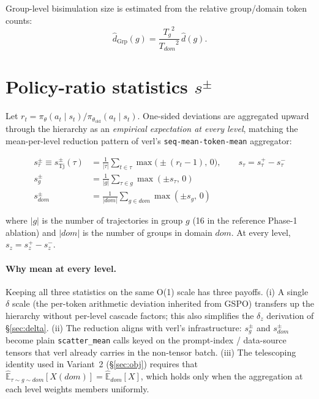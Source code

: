 \documentclass{article}
\begin{document}
Group-level bisimulation size is estimated from the relative group/domain
token counts:
\[
\hat d_{\operatorname{Grp}}(g)
  = \frac{{T_g}^{2}}{{T_{dom}}^{2}}\,\hat d(g).
\]

\section{Policy-ratio statistics \texorpdfstring{$s^{\pm}$}{s+/-}}

Let $r_t = \pi_\theta(a_t\mid s_t) / \pi_{\theta_{\text{old}}}(a_t\mid s_t)$.
One-sided deviations are aggregated upward through the hierarchy as an
\emph{empirical expectation at every level}, matching the mean-per-level
reduction pattern of verl's \verb|seq-mean-token-mean| aggregator:

\begin{align*}
s_\tau^{\pm} \equiv s_{\operatorname{Tj}}^{\pm}(\tau)
  &= \frac{1}{|\tau|}\sum_{t\in\tau}\max\!\bigl(\pm(r_t-1),\,0\bigr),
     \qquad s_\tau = s_\tau^{+} - s_\tau^{-} \\[3pt]
s_g^{\pm}   &= \frac{1}{|g|}\sum_{\tau \in g}\max(\pm s_\tau,\,0) \\[3pt]
s_{dom}^{\pm} &= \frac{1}{|dom|}\sum_{g \in dom}\max(\pm s_g,\,0)
\end{align*}

where $|g|$ is the number of trajectories in group $g$ (16 in the reference
Phase-1 ablation) and $|dom|$ is the number of groups in domain $dom$. At
every level, $s_z = s_z^{+} - s_z^{-}$.

\paragraph{Why mean at every level.}
Keeping all three statistics on the same O(1) scale has three payoffs.
(i) A single $\delta$ scale (the per-token arithmetic deviation inherited
from GSPO) transfers up the hierarchy without per-level cascade factors;
this also simplifies the $\delta_z$ derivation of \S\ref{sec:delta}.
(ii) The reduction aligns with verl's infrastructure: $s_g^{\pm}$ and
$s_{dom}^{\pm}$ become plain \verb|scatter_mean| calls keyed on the
prompt-index / data-source tensors that verl already carries in the
non-tensor batch.
(iii) The telescoping identity used in Variant~2 (\S\ref{sec:obj}) requires
that $\widehat{\mathbb E}_{\tau\sim g\sim dom}[X(dom)] = \widehat{\mathbb
E}_{dom}[X]$, which holds only when the aggregation at each level weights
members uniformly.
\end{document}
